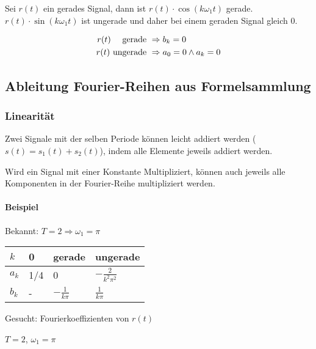 Sei $r(t)$ ein gerades Signal, dann ist $r(t) \cdot \cos(k \omega_1 t)$ gerade. $r(t) \cdot \sin(k \omega_1 t)$ ist ungerade und daher bei einem geraden Signal gleich $0$.

\begin{align*}
r(t) \text{ \space\space\space gerade }   &\Rightarrow b_k = 0 \\
r(t) \text{ ungerade } &\Rightarrow a_0 = 0 \land a_k = 0
\end{align*}



\subsection{Ableitung Fourier-Reihen aus Formelsammlung}

\subsubsection{Linearität}

Zwei Signale mit der selben Periode können leicht addiert werden ($s(t) = s_1(t) + s_2(t)$), indem alle Elemente jeweils addiert werden.

Wird ein Signal mit einer Konstante Multipliziert, können auch jeweils alle Komponenten in der Fourier-Reihe multipliziert werden.


\paragraph{Beispiel}


Bekannt: $T=2 \Rightarrow \omega_1 = \pi$

\begin{tabu}{l | l | l | l}
	$k$ & 0 & gerade & ungerade \\ \hline
	$a_k$ & 1/4 & 0 & $-\frac{2}{k^2\pi^2}$ \\ \hline
	$b_k$ & - & $-\frac{1}{k\pi}$ & $\frac{1}{k\pi}$
\end{tabu}




Gesucht: Fourierkoeffizienten von $r(t)$

$T=2$, $\omega_1 = \pi$

